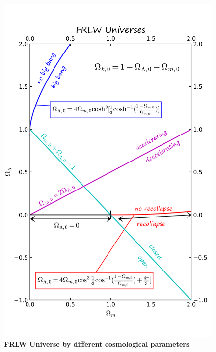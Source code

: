 \documentclass[14pt]{article}
\begin{document}
\pagebreak
\begin{figure}[H]
\centering
\includegraphics[scale=1]{Universes.png}
\caption{\textbf{FRLW Universe by different cosmological parameters}}
\end{figure}

\pagebreak


\end{document}
